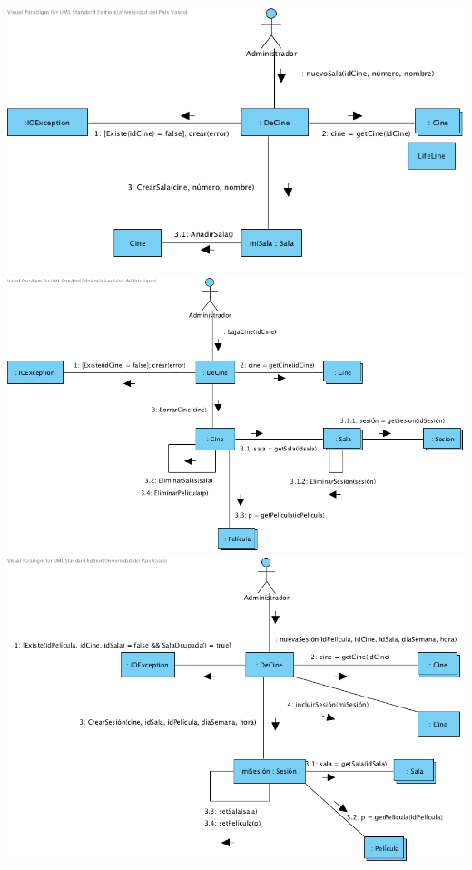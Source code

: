 \documentclass{article}
\begin{document}
\begin{center}
\includegraphics[width=1\linewidth]{./C-1}
\includegraphics[width=1\linewidth]{./C-2}
\includegraphics[width=1\linewidth]{./C-3}

\end{center}
\end{document}
